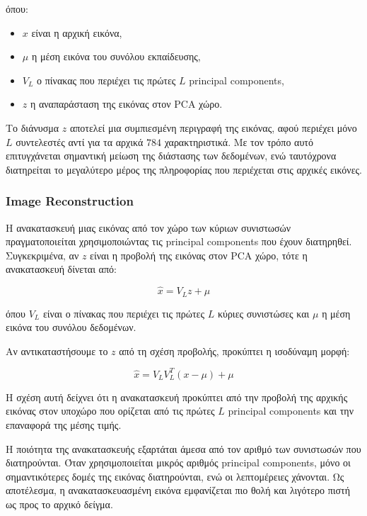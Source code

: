 \documentclass[12pt]{article}
\begin{document}
όπου:

\begin{itemize}
\item $x$ είναι η αρχική εικόνα,
\item $\mu$ η μέση εικόνα του συνόλου εκπαίδευσης,
\item $V_L$ ο πίνακας που περιέχει τις πρώτες $L$ principal components,
\item $z$ η αναπαράσταση της εικόνας στον PCA χώρο.
\end{itemize}

Το διάνυσμα $z$ αποτελεί μια συμπιεσμένη περιγραφή της εικόνας, αφού περιέχει μόνο $L$ συντελεστές αντί για τα αρχικά $784$ χαρακτηριστικά. 
Με τον τρόπο αυτό επιτυγχάνεται σημαντική μείωση της διάστασης των δεδομένων, ενώ ταυτόχρονα διατηρείται το μεγαλύτερο μέρος της πληροφορίας που 
περιέχεται στις αρχικές εικόνες.




\subsubsection{Image Reconstruction}
Η ανακατασκευή μιας εικόνας από τον χώρο των κύριων συνιστωσών πραγματοποιείται χρησιμοποιώντας τις principal components που έχουν διατηρηθεί. 
Συγκεκριμένα, αν $z$ είναι η προβολή της εικόνας στον PCA χώρο, τότε η ανακατασκευή δίνεται από:

\begin{equation}
\hat{x} = V_L z + \mu
\end{equation}

όπου $V_L$ είναι ο πίνακας που περιέχει τις πρώτες $L$ κύριες συνιστώσες και $\mu$ η μέση εικόνα του συνόλου δεδομένων.

Αν αντικαταστήσουμε το $z$ από τη σχέση προβολής, προκύπτει η ισοδύναμη μορφή:

\begin{equation}
\hat{x} = V_L V_L^{T}(x-\mu) + \mu
\end{equation}

Η σχέση αυτή δείχνει ότι η ανακατασκευή προκύπτει από την προβολή της αρχικής εικόνας στον υποχώρο που ορίζεται από τις πρώτες $L$ principal components 
και την επαναφορά της μέσης τιμής.

Η ποιότητα της ανακατασκευής εξαρτάται άμεσα από τον αριθμό των συνιστωσών που διατηρούνται. Όταν χρησιμοποιείται μικρός αριθμός principal components, 
μόνο οι σημαντικότερες δομές της εικόνας διατηρούνται, ενώ οι λεπτομέρειες χάνονται. Ως αποτέλεσμα, η ανακατασκευασμένη εικόνα εμφανίζεται πιο θολή και 
λιγότερο πιστή ως προς το αρχικό δείγμα.
\end{document}
